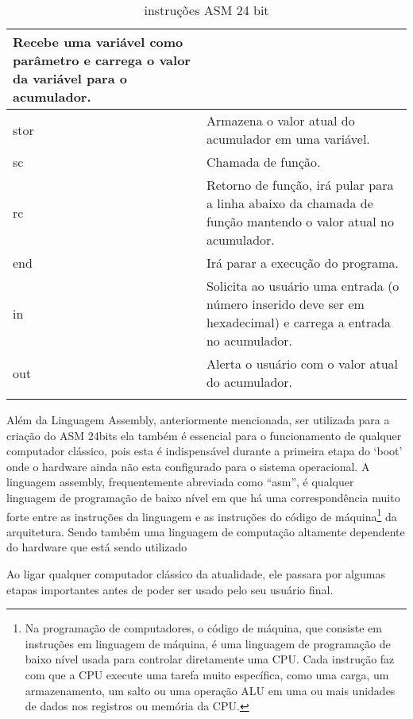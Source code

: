 \begin{longtable}{ |p{3cm}||p{11cm}|  }
  Recebe uma variável como parâmetro e carrega o valor da variável para o acumulador. \\
  \hline
  stor &
  Armazena o valor atual do acumulador em uma variável. \\
  \hline
  sc &
  Chamada de função. \\
  \hline
  rc &
  Retorno de função, irá pular para a linha abaixo da chamada de função mantendo o valor atual no acumulador. \\
  \hline
  end &
  Irá parar a execução do programa. \\
  \hline
  in &
  Solicita ao usuário uma entrada (o número inserido deve ser em hexadecimal) e carrega a entrada no acumulador. \\
  \hline
  out &
  Alerta o usuário com o valor atual do acumulador. \\
  \hline
  \caption{instruções ASM 24 bit}
  \label{table:2}
\end{longtable}
\vspace{1cm}

Além da Linguagem Assembly, anteriormente mencionada, ser utilizada para a criação do ASM 24bits ela também é essencial para o funcionamento de qualquer computador clássico, pois esta é indispensável durante a primeira etapa do `boot' onde o hardware ainda não esta configurado para o sistema operacional. A linguagem assembly, frequentemente abreviada como ``asm'', é qualquer linguagem de programação de baixo nível em que há uma correspondência muito forte entre as instruções da linguagem e as instruções do código de máquina\footnote{Na programação de computadores, o código de máquina, que consiste em instruções em linguagem de máquina, é uma linguagem de programação de baixo nível usada para controlar diretamente uma CPU. Cada instrução faz com que a CPU execute uma tarefa muito específica, como uma carga, um armazenamento, um salto ou uma operação ALU em uma ou mais unidades de dados nos registros ou memória da CPU.} da arquitetura. Sendo também uma linguagem de computação altamente dependente do hardware que está sendo utilizado

Ao ligar qualquer computador clássico da atualidade, ele passara por algumas etapas importantes antes de poder ser usado pelo seu usuário final. 

